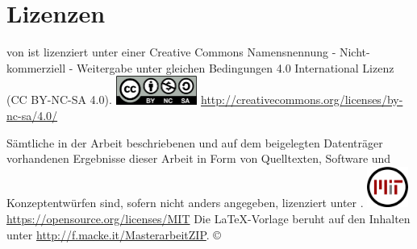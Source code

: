 \chapter*{Lizenzen}
\begin{center}
\vspace*{\fill}
\quotes{\titel} von \autor\space ist lizenziert unter einer Creative Commons Namensnennung - Nicht-kommerziell - Weitergabe unter gleichen Bedingungen 4.0 International Lizenz (CC BY-NC-SA 4.0). 
\includegraphics[width=0.2\textwidth]{Bilder/by-nc-sa-eu}
\url{http://creativecommons.org/licenses/by-nc-sa/4.0/}
\bigskip\bigskip\bigskip\bigskip

Sämtliche in der Arbeit beschriebenen und auf dem beigelegten Datenträger
vorhandenen Ergebnisse dieser Arbeit in Form von Quelltexten, Software und
Konzeptentwürfen sind, sofern nicht anders angegeben, lizenziert unter . 
\includegraphics[width=0.1\textwidth]{Bilder/mit_license}
\url{https://opensource.org/licenses/MIT}
\bigskip\bigskip\bigskip\bigskip
Die LaTeX-Vorlage beruht auf den Inhalten unter
\url{http://f.macke.it/MasterarbeitZIP}.
\bigskip\bigskip\bigskip\bigskip
{\large \copyright \space \jahr \space \autor}
\vspace*{\fill}
\end{center}
